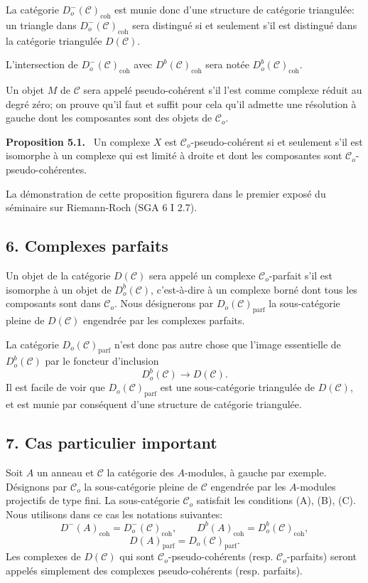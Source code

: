 \documentclass[11pt]{article}
\newenvironment{statement}[1]{\par\medskip\noindent\textbf{#1.}\ }{\par\medskip}
\providecommand{\parf}{\mathrm{parf}}
\providecommand{\coh}{\mathrm{coh}}
\providecommand{\cC}{\mathcal C}
\providecommand{\cC}{\mathcal C}
\providecommand{\parf}{\mathrm{parf}}
\providecommand{\coh}{\mathrm{coh}}
\begin{document}
La catégorie $D_o^-(\cC)_{\coh}$ est munie donc d'une structure de catégorie triangulée: un triangle dans $D_o^-(\cC)_{\coh}$ sera distingué si et seulement s'il est distingué dans la catégorie triangulée $D(\cC)$.

L'intersection de $D_o^-(\cC)_{\coh}$ avec $D^b(\cC)_{\coh}$ sera notée $D_o^b(\cC)_{\coh}$.

Un objet $M$ de $\cC$ sera appelé pseudo-cohérent s'il l'est comme complexe réduit au degré zéro; on prouve qu'il faut et suffit pour cela qu'il admette une résolution à gauche dont les composantes sont des objets de $\cC_o$.

\begin{statement}{Proposition 5.1}
Un complexe $X$ est $\cC_o$-pseudo-cohérent si et seulement s'il est isomorphe à un complexe qui est limité à droite et dont les composantes sont $\cC_o$-pseudo-cohérentes.
\end{statement}

La démonstration de cette proposition figurera dans le premier exposé du séminaire sur Riemann-Roch (SGA 6 I 2.7).

\subsection*{6. Complexes parfaits}

Un objet de la catégorie $D(\cC)$ sera appelé un complexe $\cC_o$-parfait s'il est isomorphe à un objet de $D_o^b(\cC)$, c'est-à-dire à un complexe borné dont tous les composants sont dans $\cC_o$. Nous désignerons par $D_o(\cC)_{\parf}$ la sous-catégorie pleine de $D(\cC)$ engendrée par les complexes parfaits.

La catégorie $D_o(\cC)_{\parf}$ n'est donc pas autre chose que l'image essentielle de $D_o^b(\cC)$ par le foncteur d'inclusion
\[
D_o^b(\cC)\longrightarrow D(\cC).
\]
Il est facile de voir que $D_o(\cC)_{\parf}$ est une sous-catégorie triangulée de $D(\cC)$, et est munie par conséquent d'une structure de catégorie triangulée.

\subsection*{7. Cas particulier important}

Soit $A$ un anneau et $\cC$ la catégorie des $A$-modules, à gauche par exemple. Désignons par $\cC_o$ la sous-catégorie pleine de $\cC$ engendrée par les $A$-modules projectifs de type fini. La sous-catégorie $\cC_o$ satisfait les conditions (A), (B), (C). Nous utilisons dans ce cas les notations suivantes:
\[
D^-(A)_{\coh}=D_o^-(\cC)_{\coh},\qquad
D^b(A)_{\coh}=D_o^b(\cC)_{\coh},
\]
\[
D(A)_{\parf}=D_o(\cC)_{\parf}.
\]
Les complexes de $D(\cC)$ qui sont $\cC_o$-pseudo-cohérents (resp. $\cC_o$-parfaits) seront appelés simplement des complexes pseudo-cohérents (resp. parfaits).
\end{document}
